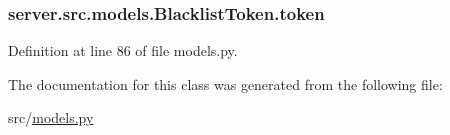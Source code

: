 \subsubsection[{\texorpdfstring{token}{token}}]{\setlength{\rightskip}{0pt plus 5cm}server.\+src.\+models.\+Blacklist\+Token.\+token}\hypertarget{classserver_1_1src_1_1models_1_1_blacklist_token_abaecaf1295a403b0076f0e697b039446}{}\label{classserver_1_1src_1_1models_1_1_blacklist_token_abaecaf1295a403b0076f0e697b039446}


Definition at line 86 of file models.\+py.



The documentation for this class was generated from the following file\+:\begin{DoxyCompactItemize}
\item 
src/\hyperlink{models_8py}{models.\+py}\end{DoxyCompactItemize}
